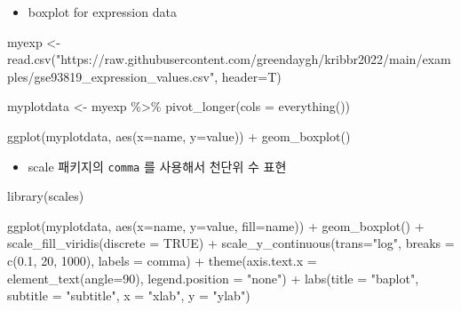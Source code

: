 \documentclass[
]{book}
\newenvironment{Shaded}{\begin{snugshade}}{\end{snugshade}}
\newcommand{\AttributeTok}[1]{\textcolor[rgb]{0.77,0.63,0.00}{#1}}
\newcommand{\ConstantTok}[1]{\textcolor[rgb]{0.00,0.00,0.00}{#1}}
\newcommand{\DecValTok}[1]{\textcolor[rgb]{0.00,0.00,0.81}{#1}}
\newcommand{\FloatTok}[1]{\textcolor[rgb]{0.00,0.00,0.81}{#1}}
\newcommand{\FunctionTok}[1]{\textcolor[rgb]{0.00,0.00,0.00}{#1}}
\newcommand{\NormalTok}[1]{#1}
\newcommand{\OtherTok}[1]{\textcolor[rgb]{0.56,0.35,0.01}{#1}}
\newcommand{\SpecialCharTok}[1]{\textcolor[rgb]{0.00,0.00,0.00}{#1}}
\newcommand{\StringTok}[1]{\textcolor[rgb]{0.31,0.60,0.02}{#1}}
\providecommand{\tightlist}{%
  \setlength{\itemsep}{0pt}\setlength{\parskip}{0pt}}
\begin{document}
\begin{itemize}
\tightlist
\item
  boxplot for expression data
\end{itemize}

\begin{Shaded}
\begin{Highlighting}[]

\NormalTok{myexp }\OtherTok{\textless{}{-}} \FunctionTok{read.csv}\NormalTok{(}\StringTok{"https://raw.githubusercontent.com/greendaygh/kribbr2022/main/examples/gse93819\_expression\_values.csv"}\NormalTok{, }\AttributeTok{header=}\NormalTok{T)}

\NormalTok{myplotdata }\OtherTok{\textless{}{-}}\NormalTok{ myexp }\SpecialCharTok{\%\textgreater{}\%} 
  \FunctionTok{pivot\_longer}\NormalTok{(}\AttributeTok{cols =} \FunctionTok{everything}\NormalTok{()) }

\FunctionTok{ggplot}\NormalTok{(myplotdata, }\FunctionTok{aes}\NormalTok{(}\AttributeTok{x=}\NormalTok{name, }\AttributeTok{y=}\NormalTok{value)) }\SpecialCharTok{+} 
  \FunctionTok{geom\_boxplot}\NormalTok{()}
\end{Highlighting}
\end{Shaded}

\begin{itemize}
\tightlist
\item
  scale 패키지의 \texttt{comma} 를 사용해서 천단위 수 표현
\end{itemize}

\begin{Shaded}
\begin{Highlighting}[]
\FunctionTok{library}\NormalTok{(scales)}


\FunctionTok{ggplot}\NormalTok{(myplotdata, }\FunctionTok{aes}\NormalTok{(}\AttributeTok{x=}\NormalTok{name, }\AttributeTok{y=}\NormalTok{value, }\AttributeTok{fill=}\NormalTok{name)) }\SpecialCharTok{+} 
  \FunctionTok{geom\_boxplot}\NormalTok{() }\SpecialCharTok{+}
  \FunctionTok{scale\_fill\_viridis}\NormalTok{(}\AttributeTok{discrete =} \ConstantTok{TRUE}\NormalTok{) }\SpecialCharTok{+}
  \FunctionTok{scale\_y\_continuous}\NormalTok{(}\AttributeTok{trans=}\StringTok{"log"}\NormalTok{,}
                     \AttributeTok{breaks =} \FunctionTok{c}\NormalTok{(}\FloatTok{0.1}\NormalTok{, }\DecValTok{20}\NormalTok{, }\DecValTok{1000}\NormalTok{),}
                     \AttributeTok{labels =}\NormalTok{ comma) }\SpecialCharTok{+}
  \FunctionTok{theme}\NormalTok{(}\AttributeTok{axis.text.x =} \FunctionTok{element\_text}\NormalTok{(}\AttributeTok{angle=}\DecValTok{90}\NormalTok{),}
        \AttributeTok{legend.position =} \StringTok{"none"}\NormalTok{) }\SpecialCharTok{+}
  \FunctionTok{labs}\NormalTok{(}\AttributeTok{title =} \StringTok{"baplot"}\NormalTok{, }
       \AttributeTok{subtitle =} \StringTok{"subtitle"}\NormalTok{,}
       \AttributeTok{x =} \StringTok{"xlab"}\NormalTok{, }
       \AttributeTok{y =} \StringTok{"ylab"}\NormalTok{)}
  
\end{Highlighting}
\end{Shaded}
\end{document}

